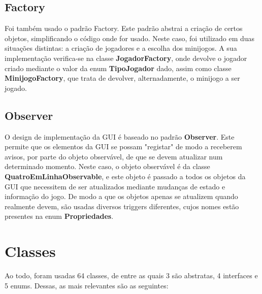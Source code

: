 \documentclass[11pt]{article}
\begin{document}
	\large
	\subsection{Factory}
	\normalsize
	
	Foi também usado o padrão Factory. Este padrão abstrai a criação de certos objetos, simplificando o código onde for usado. Neste caso, foi utilizado em duas situações distintas: a criação de jogadores e a escolha dos minijogos. A sua implementação verifica-se na classe \textbf{JogadorFactory}, onde devolve o jogador criado mediante o valor da enum \textbf{TipoJogador} dado, assim como classe \textbf{MinijogoFactory}, que trata de devolver, alternadamente, o minijogo a ser jogado.
	
	\large
	\subsection{Observer}
	\normalsize
	
	O design de implementação da GUI é baseado no padrão \textbf{Observer}. Este permite que os elementos da GUI se possam "registar" de modo a receberem avisos, por parte do objeto observável, de que se devem atualizar num determinado momento. Neste caso, o objeto observável é da classe \textbf{QuatroEmLinhaObservable}, e este objeto é passado a todos os objetos da GUI que necessitem de ser atualizados mediante mudanças de estado e informação do jogo. De modo a que os objetos apenas se atualizem quando realmente devem, são usadas diversos triggers diferentes, cujos nomes estão presentes na enum \textbf{Propriedades}.
	
	\pagebreak
	
	\large
	\section{Classes}
	\normalsize
	
	Ao todo, foram usadas 64 classes, de entre as quais 3 são abstratas, 4 interfaces e 5 enums. Dessas, as mais relevantes são as seguintes: 
	
\end{document}
